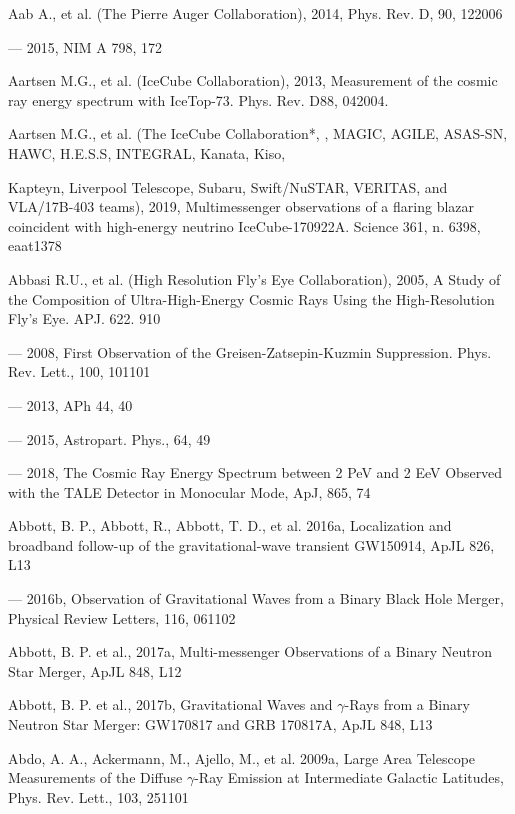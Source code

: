 
Aab A., et al. (The Pierre Auger Collaboration), 2014, Phys. Rev. D, 90, 122006

--- 2015, NIM A 798, 172

Aartsen M.G., et al. (IceCube Collaboration), 2013, Measurement of the cosmic ray energy spectrum with IceTop-73. Phys. Rev. D88, 
042004.

Aartsen M.G., et al. (The IceCube Collaboration*, \fermilat{}, MAGIC, AGILE, ASAS-SN, HAWC, H.E.S.S, INTEGRAL, Kanata, Kiso, 

Kapteyn, Liverpool Telescope, Subaru, Swift/NuSTAR, VERITAS, and VLA/17B-403 teams), 2019, Multimessenger observations of a flaring blazar coincident with high-energy neutrino IceCube-170922A. Science 361, n. 6398, eaat1378

Abbasi R.U., et al. (High Resolution Fly's Eye Collaboration), 2005, A Study of the Composition of Ultra-High-Energy Cosmic Rays Using the High-Resolution Fly's Eye. APJ. 622. 910

--- 2008, First Observation of the Greisen-Zatsepin-Kuzmin Suppression. Phys. Rev. Lett., 100, 101101

--- 2013, APh 44, 40

--- 2015, Astropart. Phys., 64, 49

--- 2018, The Cosmic Ray Energy Spectrum between 2 PeV and 2 EeV Observed with the TALE Detector in Monocular Mode, ApJ, 865, 74

Abbott, B. P., Abbott, R., Abbott, T. D., et al. 2016a, Localization and broadband follow-up of the gravitational-wave transient GW150914, ApJL 826, L13

--- 2016b, Observation of Gravitational Waves from a Binary Black Hole Merger, Physical Review Letters, 116, 061102

Abbott, B. P. et al., 2017a, Multi-messenger Observations of a Binary Neutron Star Merger, ApJL 848, L12

Abbott, B. P. et al., 2017b, Gravitational Waves and $\gamma$-Rays from a Binary Neutron Star Merger: GW170817 and GRB 170817A, ApJL 848, L13

Abdo, A. A., Ackermann, M., Ajello, M., et al. 2009a, \fermi{} Large Area Telescope Measurements of the Diffuse $\gamma$-Ray Emission at Intermediate Galactic Latitudes, Phys. Rev. Lett., 103, 251101

